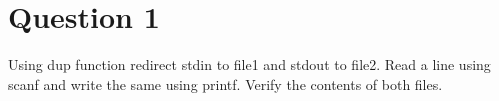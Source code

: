 \documentclass[main.tex]{subfiles}
\begin{document}
\section{Question 1}
Using dup function redirect stdin to file1 and stdout to file2. Read a line
using scanf and write the same using printf. Verify the contents of both files.




\end{document}
